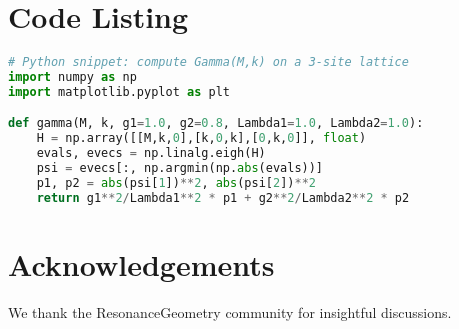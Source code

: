 \documentclass[11pt]{article}
\begin{document}
\section*{Code Listing}
\begin{lstlisting}[language=Python, basicstyle=\ttfamily\small]
# Python snippet: compute Gamma(M,k) on a 3-site lattice
import numpy as np
import matplotlib.pyplot as plt

def gamma(M, k, g1=1.0, g2=0.8, Lambda1=1.0, Lambda2=1.0):
    H = np.array([[M,k,0],[k,0,k],[0,k,0]], float)
    evals, evecs = np.linalg.eigh(H)
    psi = evecs[:, np.argmin(np.abs(evals))]
    p1, p2 = abs(psi[1])**2, abs(psi[2])**2
    return g1**2/Lambda1**2 * p1 + g2**2/Lambda2**2 * p2
\end{lstlisting}

\section*{Acknowledgements}
We thank the ResonanceGeometry community for insightful discussions.



\end{document}

